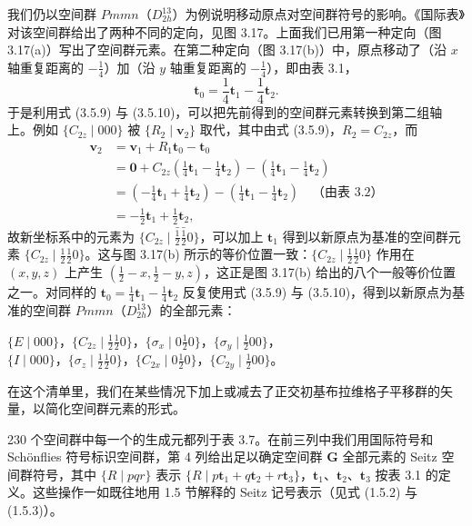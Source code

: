我们仍以空间群 $Pmmn$（$D_{2h}^{13}$）为例说明移动原点对空间群符号的影响。《国际表》对该空间群给出了两种不同的定向，见图 3.17。上面我们已用第一种定向（图 3.17(a)）写出了空间群元素。在第二种定向（图 3.17(b)）中，原点移动了（沿 $x$ 轴重复距离的 $-\frac{1}{4}$）加（沿 $y$ 轴重复距离的 $-\frac{1}{4}$），即由表 3.1，
\begin{equation*}
\mathbf{t}_{0} = \frac{1}{4}\mathbf{t}_{1} - \frac{1}{4}\mathbf{t}_{2}.
\tag{3.5.12}
\end{equation*}
于是利用式 (3.5.9) 与 (3.5.10)，可以把先前得到的空间群元素转换到第二组轴上。例如 $\{C_{2z} \mid 000\}$ 被 $\{R_{2} \mid \mathbf{v}_{2}\}$ 取代，其中由式 (3.5.9)，$R_{2} = C_{2z}$，而
\begin{align*}
\mathbf{v}_{2} &= \mathbf{v}_{1} + R_{1}\mathbf{t}_{0} - \mathbf{t}_{0}\\
&= \mathbf{0} + C_{2z}\left(\tfrac{1}{4}\mathbf{t}_{1} - \tfrac{1}{4}\mathbf{t}_{2}\right) - \left(\tfrac{1}{4}\mathbf{t}_{1} - \tfrac{1}{4}\mathbf{t}_{2}\right)\\
&= \left(-\tfrac{1}{4}\mathbf{t}_{1} + \tfrac{1}{4}\mathbf{t}_{2}\right) - \left(\tfrac{1}{4}\mathbf{t}_{1} - \tfrac{1}{4}\mathbf{t}_{2}\right)\quad\text{（由表 3.2）}\\
&= -\tfrac{1}{2}\mathbf{t}_{1} + \tfrac{1}{2}\mathbf{t}_{2},
\tag{3.5.13}
\end{align*}
故新坐标系中的元素为 $\{C_{2z} \mid \bar{\frac{1}{2}}\bar{\frac{1}{2}}0\}$，可以加上 $\mathbf{t}_{1}$ 得到以新原点为基准的空间群元素 $\{C_{2z} \mid \frac{1}{2}\frac{1}{2}0\}$。这与图 3.17(b) 所示的等价位置一致：$\{C_{2z} \mid \frac{1}{2}\frac{1}{2}0\}$ 作用在 $(x, y, z)$ 上产生 $(\frac{1}{2}-x, \frac{1}{2}-y, z)$，这正是图 3.17(b) 给出的八个一般等价位置之一。对同样的 $\mathbf{t}_{0} = \frac{1}{4}\mathbf{t}_{1} - \frac{1}{4}\mathbf{t}_{2}$ 反复使用式 (3.5.9) 与 (3.5.10)，得到以新原点为基准的空间群 $Pmmn$（$D_{2h}^{13}$）的全部元素：
\begin{center}
$\{E \mid 000\}$，$\{C_{2z} \mid \frac{1}{2}\frac{1}{2}0\}$，$\{\sigma_{x} \mid 0\frac{1}{2}0\}$，$\{\sigma_{y} \mid \frac{1}{2}00\}$，\\[0.5ex]
$\{I \mid 000\}$，$\{\sigma_{z} \mid \frac{1}{2}\frac{1}{2}0\}$，$\{C_{2x} \mid 0\frac{1}{2}0\}$，$\{C_{2y} \mid \frac{1}{2}00\}$。
\end{center}
在这个清单里，我们在某些情况下加上或减去了正交初基布拉维格子平移群的矢量，以简化空间群元素的形式。

230 个空间群中每一个的生成元都列于表 3.7。在前三列中我们用国际符号和 Schönflies 符号标识空间群，第 4 列给出足以确定空间群 $\mathbf{G}$ 全部元素的 Seitz 空间群符号，其中 $\{R \mid pqr\}$ 表示 $\{R \mid p\mathbf{t}_{1} + q\mathbf{t}_{2} + r\mathbf{t}_{3}\}$，$\mathbf{t}_{1}$、$\mathbf{t}_{2}$、$\mathbf{t}_{3}$ 按表 3.1 的定义。这些操作一如既往地用 1.5 节解释的 Seitz 记号表示（见式 (1.5.2) 与 (1.5.3)）。

